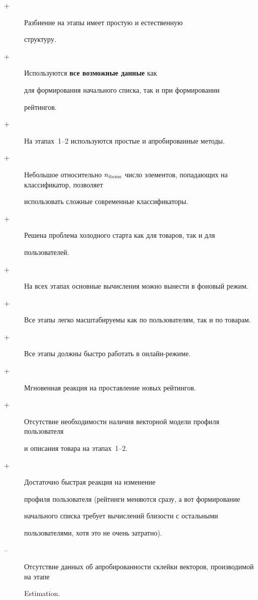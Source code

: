 \begin{description} %


\item[+] Разбиение на этапы имеет простую и естественную


структуру. 


\item[+] Используются \textbf{все возможные данные} как


для формирования начального списка, так и при формировании


рейтингов. 


\item[+] На этапах~1--2 используются простые и апробированные методы. 


\item[+] Небольшое относительно $n_{\mathrm{items}}$ число элементов, попадающих на классификатор, позволяет


использовать сложные современные классификаторы. 


\item[+] Решена проблема холодного старта как для товаров, так и для


пользователей. 


\item[+] На всех этапах основные вычисления можно вынести в фоновый режим. 


\item[+] Все этапы легко масштабируемы как по пользователям, так и по товарам. 


\item[+] Все этапы должны быстро работать в он\-лайн-ре\-жи\-ме. 


\item[+] Мгновенная реакция на проставление новых рейтингов. 


\item[+] Отсутствие необходимости наличия векторной модели профиля пользователя 


и описания товара на этапах~1--2. 


\item[+] Достаточно быстрая реакция на изменение


профиля пользователя (рейтинги меняются сразу, а вот формирование


начального списка требует вычислений близости с остальными


пользователями, хотя это не очень за\-трат\-но). 


\item[--] Отсутствие данных об апробированности склейки векторов, производимой на этапе


Estimation.


\end{description}





